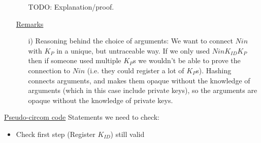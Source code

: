 \documentclass{article}
\newcommand{\khk}{K_{P}}
\newcommand{\kid}{K_{ID}}
\begin{document}
\begin{enumerate}[leftmargin=0cm]
\begin{itemize}
    TODO: Explanation/proof.
\end{itemize}

\item[] \underline{Remarks}
\begin{itemize}
\item[i)] Reasoning behind the choice of arguments:
We want to connect $Nin$ with $\khk$ in a unique, but untraceable way.
If we only used $Nin\kid\khk$ then if someone used multiple $\khk$s we wouldn't be able to prove the connection to $Nin$ (i.e. they could register a lot of $\khk$s).
Hashing connects arguments, and makes them opaque without the knowledge of arguments (which in this case include private keys), so the arguments are opaque without the knowledge of private keys.
\end{itemize}


\end{enumerate}

\newpage
\underline{Pseudo-circom code}
Statements we need to check:
\begin{itemize}
	\item Check first step (Register $\kid$) still valid

\end{itemize}
\end{document}
